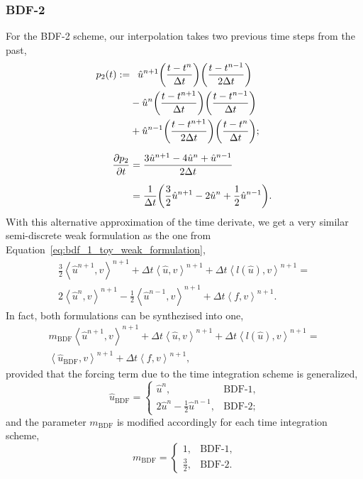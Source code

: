 \documentclass[../../thesis.tex]{subfiles}
\newcommand{\inner}[2]{\left<#1, #2\right>}
\newcommand{\dt}{\ensuremath{\Delta t}}
\begin{document}
\subsubsection{BDF-2}
For the BDF-2 scheme,
our interpolation takes two previous time steps from the past,
\begin{subequations}
\begin{align}
    p_2(t) 
    := 
    &\phantom{+}\hat{u}^{n+1}
    \qty(\frac{t-t^{n}}{\dt})
    \qty(\frac{t-t^{n-1}}{2\dt})
    \nonumber \\
    &-
    \hat{u}^{n}
    \qty(\frac{t-t^{n+1}}{\dt})
    \qty(\frac{t-t^{n-1}}{\dt}) 
    \nonumber \\
    &+
    \hat{u}^{n-1}
    \qty(\frac{t-t^{n+1}}{2\dt})
    \qty(\frac{t-t^{n}}{\dt});
    \\[2mm]
    \pdv{p_2}{t} 
    &= 
    \frac{3\hat{u}^{n+1} - 4\hat{u}^{n} + \hat{u}^{n-1}}{2\dt}
    \nonumber 
    \\[2mm]
    &= \frac{1}{\dt}
    \qty(
        \frac{3}{2}\hat{u}^{n+1} 
        - 2\hat{u}^{n} 
        + \frac{1}{2}\hat{u}^{n-1}
        ).
    \end{align}
\end{subequations}
With this alternative approximation of the time derivate, 
we get a very similar semi-discrete weak formulation as the one 
from Equation~\eqref{eq:bdf_1_toy_weak_formulation},
\begin{align}
    \frac{3}{2}\inner{\hat{u}^{n+1}}{v}^{n+1}
    + \dt \inner{\hat{u}}{v}^{n+1}
    + \dt \inner{l(\hat{u})}{v}^{n+1}
    =
    \nonumber \\
    2            \inner{\hat{u}^{n}  }{v}^{n+1}
    - \frac{1}{2}\inner{\hat{u}^{n-1}}{v}^{n+1}
    + 
    \dt \inner{f}{v}^{n+1}.
    \label{eq:bdf_2_toy_weak_formulation}
\end{align}
In fact, both formulations can be synthezised into one,
\begin{align}
    m_{\text{BDF}}\inner{\hat{u}^{n+1}}{v}^{n+1}
    + \dt \inner{\hat{u}}{v}^{n+1}
    + \dt \inner{l(\hat{u})}{v}^{n+1}
    =
    \nonumber 
    \\[2mm]
    \inner{\hat{u}_{\text{BDF}}  }{v}^{n+1}
    + 
    \dt \inner{f}{v}^{n+1},
    \label{eq:weak_formulation_generalized_bdf}
\end{align}
provided that the forcing term due to the time integration scheme is generalized,
\begin{equation}
    \hat{u}_{\text{BDF}} =
    \begin{cases}
        \hat{u}^{n}, &\text{BDF-1},
        \\    
        2\hat{u}^{n} 
        -\frac{1}{2}\hat{u}^{n-1}, &\text{BDF-2};
    \end{cases}
    \label{eq:bdf_forcing_term_generalization}
\end{equation}
and the parameter $m_{\text{BDF}}$ is modified accordingly for each time integration scheme,
\begin{equation}
    m_{\text{BDF}} = 
    \begin{cases}
    1, &\text{BDF-1},
    \\    
    \frac{3}{2}, &\text{BDF-2}.
    \end{cases}
\end{equation}
\end{document}
